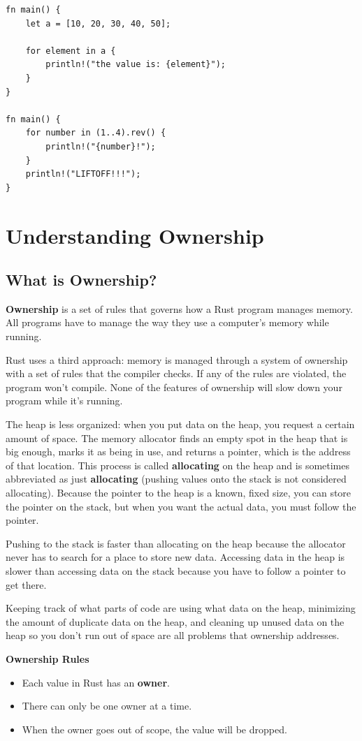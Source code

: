 \documentclass[11pt]{article}
\begin{document}
\begin{verbatim}
fn main() {
    let a = [10, 20, 30, 40, 50];

    for element in a {
        println!("the value is: {element}");
    }
}

fn main() {
    for number in (1..4).rev() {
        println!("{number}!");
    }
    println!("LIFTOFF!!!");
}
\end{verbatim}
\section{Understanding Ownership}
\label{sec:org20f700c}
\subsection{What is Ownership?}
\label{sec:orga3008ae}
\textbf{Ownership} is a set of rules that governs how a Rust program manages memory. All programs have to
 manage the way they use a computer's memory while running.

Rust uses a third approach: memory is managed through a system of ownership with a set of rules
that the compiler checks. If any of the rules are violated, the program won’t compile. None of
the features of ownership will slow down your program while it’s running.

The heap is less organized: when you put data on the heap, you request a certain amount of
space. The memory allocator finds an empty spot in the heap that is big enough, marks it as
being in use, and returns a pointer, which is the address of that location. This process is
called \textbf{allocating} on the heap and is sometimes abbreviated as just \textbf{allocating} (pushing values
onto the stack is not considered allocating). Because the pointer to the heap is a known, fixed
size, you can store the pointer on the stack, but when you want the actual data, you must
follow the pointer.

Pushing to the stack is faster than allocating on the heap because the allocator never has to
search for a place to store new data. Accessing data in the heap is slower than accessing data
on the stack because you have to follow a pointer to get there.

Keeping track of what parts of code are using what data on the heap, minimizing the amount of
duplicate data on the heap, and cleaning up unused data on the heap so you don’t run out of
space are all problems that ownership addresses.

\textbf{Ownership Rules}
\begin{itemize}
\item Each value in Rust has an \textbf{owner}.
\item There can only be one owner at a time.
\item When the owner goes out of scope, the value will be dropped.
\end{itemize}
\end{document}
